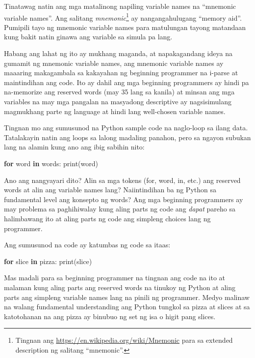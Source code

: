 \documentclass[10pt,]{book}
\newenvironment{Shaded}{}{}
\newcommand{\BuiltInTok}[1]{\textcolor[rgb]{0.00,0.50,0.00}{#1}}
\newcommand{\ControlFlowTok}[1]{\textcolor[rgb]{0.00,0.44,0.13}{\textbf{#1}}}
\newcommand{\KeywordTok}[1]{\textcolor[rgb]{0.00,0.44,0.13}{\textbf{#1}}}
\newcommand{\NormalTok}[1]{#1}
\begin{document}
Tinatawag natin ang mga matalinong napiling variable names na ``mnemonic
variable names''. Ang salitang \emph{mnemonic}\footnote{Tingnan ang
  \url{https://en.wikipedia.org/wiki/Mnemonic} para sa extended
  description ng salitang ``mnemonic''.} ay nangangahulugang ``memory
aid''. Pumipili tayo ng mnemonic variable names para matulungan tayong
matandaan kung bakit natin ginawa ang variable sa simula pa lang.

Habang ang lahat ng ito ay mukhang maganda, at napakagandang ideya na
gumamit ng mnemonic variable names, ang mnemonic variable names ay
maaaring makagambala sa kakayahan ng beginning programmer na i-parse at
maintindihan ang code. Ito ay dahil ang mga beginning programmers ay
hindi pa na-memorize ang reserved words (may 35 lang sa kanila) at
minsan ang mga variables na may mga pangalan na masyadong descriptive ay
nagsisimulang magmukhang parte ng language at hindi lang well-chosen
variable names.

Tingnan mo ang sumusunod na Python sample code na naglo-loop sa ilang
data. Tatalakayin natin ang loops sa lalong madaling panahon, pero sa
ngayon subukan lang na alamin kung ano ang ibig sabihin nito:

\begin{Shaded}
\begin{Highlighting}[]
\ControlFlowTok{for}\NormalTok{ word }\KeywordTok{in}\NormalTok{ words:}
    \BuiltInTok{print}\NormalTok{(word)}
\end{Highlighting}
\end{Shaded}

Ano ang nangyayari dito? Alin sa mga tokens (for, word, in, etc.) ang
reserved words at alin ang variable names lang? Naiintindihan ba ng
Python sa fundamental level ang konsepto ng words? Ang mga beginning
programmers ay may problema sa paghihiwalay kung aling parts ng code ang
\emph{dapat} pareho sa halimbawang ito at aling parts ng code ang
simpleng choices lang ng programmer.

Ang sumusunod na code ay katumbas ng code sa itaas:

\begin{Shaded}
\begin{Highlighting}[]
\ControlFlowTok{for} \BuiltInTok{slice} \KeywordTok{in}\NormalTok{ pizza:}
    \BuiltInTok{print}\NormalTok{(}\BuiltInTok{slice}\NormalTok{)}
\end{Highlighting}
\end{Shaded}

Mas madali para sa beginning programmer na tingnan ang code na ito at
malaman kung aling parts ang reserved words na tinukoy ng Python at
aling parts ang simpleng variable names lang na pinili ng programmer.
Medyo malinaw na walang fundamental understanding ang Python tungkol sa
pizza at slices at sa katotohanan na ang pizza ay binubuo ng set ng isa
o higit pang slices.
\end{document}
